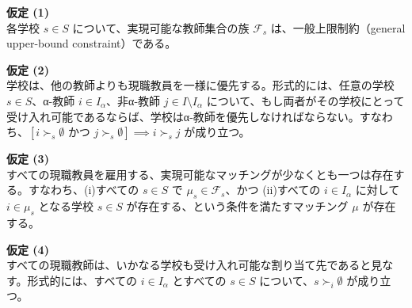 \documentclass[12pt, a4paper]{article}
\theoremstyle{definition}
\theoremstyle{remark}
\theoremstyle{plain}
\begin{document}
\vspace{0.5\baselineskip} %
\noindent\textbf{仮定 (1)} \\
各学校 $s \in S$ について、実現可能な教師集合の族 $\mathcal{F}_s$ は、一般上限制約（general upper-bound constraint）である。

\vspace{0.5\baselineskip}
\noindent\textbf{仮定 (2)} \\
学校は、他の教師よりも現職教員を一様に優先する。形式的には、任意の学校 $s \in S$、α-教師 $i \in I_\alpha$、非α-教師 $j \in I\setminus I_\alpha$ について、もし両者がその学校にとって受け入れ可能であるならば、学校はα-教師を優先しなければならない。すなわち、$[i \succ_s \emptyset \text{ かつ } j \succ_s \emptyset] \implies i \succ_s j$ が成り立つ。

\vspace{0.5\baselineskip}
\noindent\textbf{仮定 (3)} \\
すべての現職教員を雇用する、実現可能なマッチングが少なくとも一つは存在する。すなわち、(i)すべての $s \in S$ で $\mu_s \in \mathcal{F}_s$、かつ (ii)すべての $i \in I_\alpha$ に対して $i \in \mu_s$ となる学校 $s \in S$ が存在する、という条件を満たすマッチング $\mu$ が存在する。

\vspace{0.5\baselineskip}
\noindent\textbf{仮定 (4)} \\
すべての現職教師は、いかなる学校も受け入れ可能な割り当て先であると見なす。形式的には、すべての $i \in I_\alpha$ とすべての $s \in S$ について、$s \succ_i \emptyset$ が成り立つ。




\end{document}
